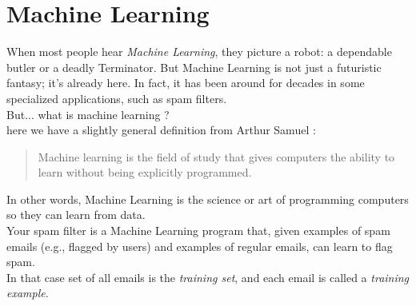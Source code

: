 \documentclass{SBCbookchapter}
\begin{document}
\section*{Machine Learning}
When most people hear \emph{Machine Learning}, they picture a robot: a dependable butler or a deadly Terminator.
But Machine Learning is not just a futuristic fantasy;
it’s already here. In fact, it has been around for decades 
in some specialized applications, such as spam filters. \\
But... what is machine learning ? \\
here we have a slightly general definition from Arthur Samuel :
\begin{quote}
Machine learning is the field of study that gives computers the ability to learn without being explicitly programmed.
\end{quote}
In other words, Machine Learning is the science or art of programming computers so they can learn from data.\\
Your spam filter is a Machine Learning
program that, given examples of spam
emails (e.g., flagged by users) and examples of regular emails,
can learn to flag spam.\\
In that case set of all emails is the \textit{training set}, and each email is called a \textit{training example}.
\end{document}
